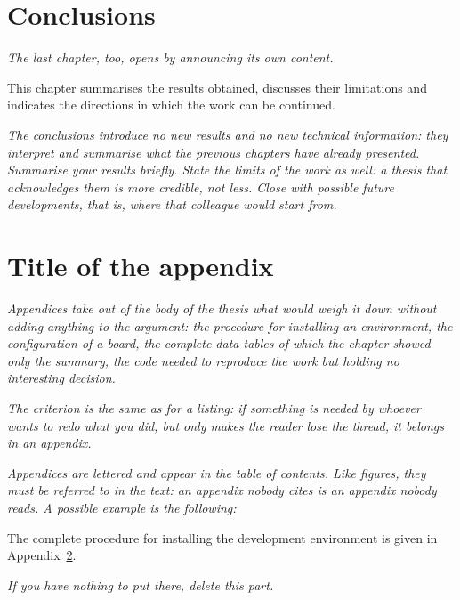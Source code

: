 \documentclass[12pt,a4paper,oneside]{report}
\newcommand{\guida}[1]{{\itshape\color{gray}#1\par}}
\newcommand{\esempio}[1]{#1\par}
\begin{document}
\chapter{Conclusions}
\guida{The last chapter, too, opens by announcing its own content.}
\esempio{This chapter summarises the results obtained, discusses their
limitations and indicates the directions in which the work can be continued.}
\guida{The conclusions introduce no new results and no new technical information: they interpret and summarise what the previous chapters have already presented. Summarise your results briefly. State the limits of the work as well: a thesis that acknowledges them is more credible, not less. Close with possible future developments, that is, where that colleague would start from.}




\appendix

\chapter{Title of the appendix}
\label{app:esempio}
\guida{Appendices take out of the body of the thesis what would weigh it down without adding anything to the argument: the procedure for installing an environment, the configuration of a board, the complete data tables of which the chapter showed only the summary, the code needed to reproduce the work but holding no interesting decision.}
\guida{The criterion is the same as for a listing: if something is needed by whoever wants to redo what you did, but only makes the reader lose the thread, it belongs in an appendix.}
\guida{Appendices are lettered and appear in the table of contents. Like figures, they must be referred to in the text: an appendix nobody cites is an appendix nobody reads. A possible example is the following:}
\esempio{The complete procedure for installing the development environment is given in Appendix~\ref{app:esempio}.}
\guida{If you have nothing to put there, delete this part.}
\end{document}
